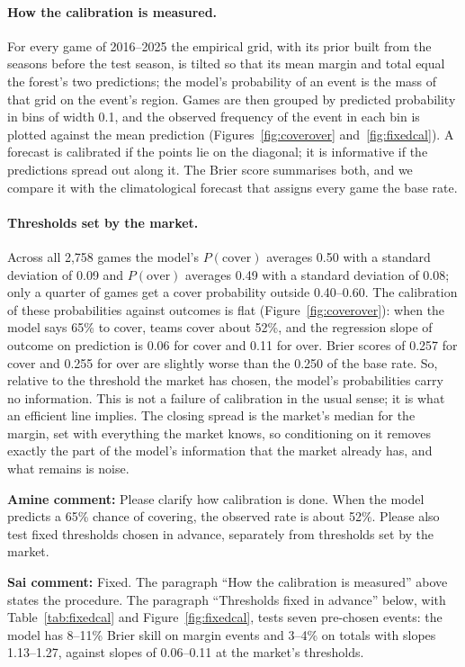 \paragraph{How the calibration is measured.} For every game of 2016--2025 the empirical grid, with its prior built from the seasons before the test season, is tilted so that its mean margin and total equal the forest's two predictions; the model's probability of an event is the mass of that grid on the event's region. Games are then grouped by predicted probability in bins of width 0.1, and the observed frequency of the event in each bin is plotted against the mean prediction (Figures~\ref{fig:coverover} and~\ref{fig:fixedcal}). A forecast is calibrated if the points lie on the diagonal; it is informative if the predictions spread out along it. The Brier score summarises both, and we compare it with the climatological forecast that assigns every game the base rate.

\paragraph{Thresholds set by the market.} Across all 2,758 games the model's $P(\text{cover})$ averages 0.50 with a standard deviation of 0.09 and $P(\text{over})$ averages 0.49 with a standard deviation of 0.08; only a quarter of games get a cover probability outside 0.40--0.60. The calibration of these probabilities against outcomes is flat (Figure~\ref{fig:coverover}): when the model says 65\% to cover, teams cover about 52\%, and the regression slope of outcome on prediction is 0.06 for cover and 0.11 for over. Brier scores of 0.257 for cover and 0.255 for over are slightly worse than the 0.250 of the base rate. So, relative to the threshold the market has chosen, the model's probabilities carry no information. This is not a failure of calibration in the usual sense; it is what an efficient line implies. The closing spread is the market's median for the margin, set with everything the market knows, so conditioning on it removes exactly the part of the model's information that the market already has, and what remains is noise.

{\color{red}\textbf{Amine comment:} Please clarify how calibration is done. When the model predicts a 65\% chance of covering, the observed rate is about 52\%. Please also test fixed thresholds chosen in advance, separately from thresholds set by the market.}

{\color{blue}\textbf{Sai comment:} Fixed. The paragraph ``How the calibration is measured'' above states the procedure. The paragraph ``Thresholds fixed in advance'' below, with Table~\ref{tab:fixedcal} and Figure~\ref{fig:fixedcal}, tests seven pre-chosen events: the model has 8--11\% Brier skill on margin events and 3--4\% on totals with slopes 1.13--1.27, against slopes of 0.06--0.11 at the market's thresholds.}

